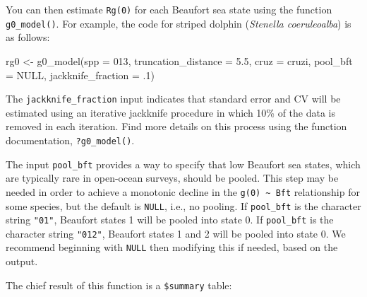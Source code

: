 \documentclass[
]{book}
\newenvironment{Shaded}{\begin{snugshade}}{\end{snugshade}}
\newcommand{\AttributeTok}[1]{\textcolor[rgb]{0.77,0.63,0.00}{#1}}
\newcommand{\ConstantTok}[1]{\textcolor[rgb]{0.00,0.00,0.00}{#1}}
\newcommand{\DecValTok}[1]{\textcolor[rgb]{0.00,0.00,0.81}{#1}}
\newcommand{\FloatTok}[1]{\textcolor[rgb]{0.00,0.00,0.81}{#1}}
\newcommand{\FunctionTok}[1]{\textcolor[rgb]{0.00,0.00,0.00}{#1}}
\newcommand{\NormalTok}[1]{#1}
\newcommand{\OtherTok}[1]{\textcolor[rgb]{0.56,0.35,0.01}{#1}}
\newcommand{\StringTok}[1]{\textcolor[rgb]{0.31,0.60,0.02}{#1}}
\begin{document}
You can then estimate \texttt{Rg(0)} for each Beaufort sea state using the function \texttt{g0\_model()}. For example, the code for striped dolphin (\emph{Stenella coeruleoalba}) is as follows:

\begin{Shaded}
\begin{Highlighting}[]
\NormalTok{rg0 }\OtherTok{\textless{}{-}} \FunctionTok{g0\_model}\NormalTok{(}\AttributeTok{spp =} \StringTok{\textquotesingle{}013\textquotesingle{}}\NormalTok{,}
                \AttributeTok{truncation\_distance =} \FloatTok{5.5}\NormalTok{,}
                \AttributeTok{cruz =}\NormalTok{ cruzi,}
                \AttributeTok{pool\_bft =} \ConstantTok{NULL}\NormalTok{,}
                \AttributeTok{jackknife\_fraction =}\NormalTok{ .}\DecValTok{1}\NormalTok{)}
\end{Highlighting}
\end{Shaded}

The \texttt{jackknife\_fraction} input indicates that standard error and CV will be estimated using an iterative jackknife procedure in which 10\% of the data is removed in each iteration. Find more details on this process using the function documentation, \texttt{?g0\_model()}.

The input \texttt{pool\_bft} provides a way to specify that low Beaufort sea states, which are typically rare in open-ocean surveys, should be pooled. This step may be needed in order to achieve a monotonic decline in the \texttt{g(0)\ \textasciitilde{}\ Bft} relationship for some species, but the default is \texttt{NULL}, i.e., no pooling. If \texttt{pool\_bft} is the character string \texttt{"01"}, Beaufort states 1 will be pooled into state 0. If \texttt{pool\_bft} is the character string \texttt{"012"}, Beaufort states 1 and 2 will be pooled into state 0. We recommend beginning with \texttt{NULL} then modifying this if needed, based on the output.

The chief result of this function is a \texttt{\$summary} table:
\end{document}
